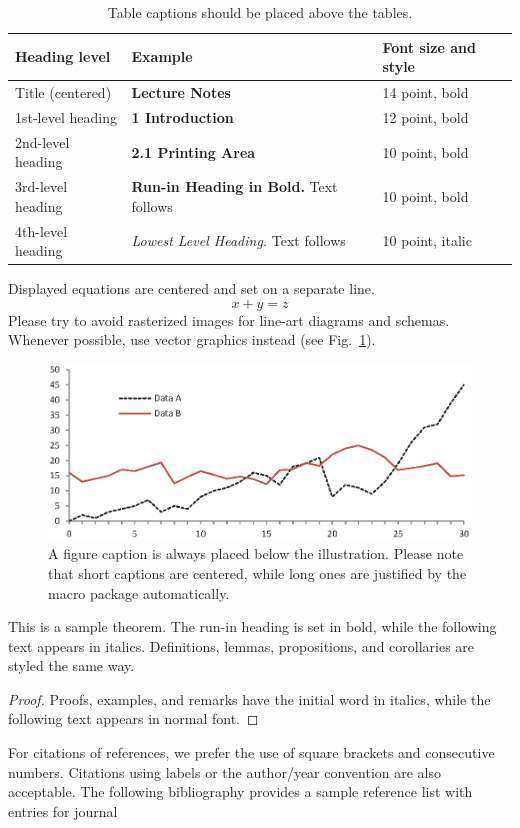 \documentclass{llncs}
\begin{document}
\begin{table}
\caption{Table captions should be placed above the
tables.}\label{tab1}
\begin{tabular}{|l|l|l|}
\hline
Heading level &  Example & Font size and style\\
\hline
Title (centered) &  {\Large\bfseries Lecture Notes} & 14 point, bold\\
1st-level heading &  {\large\bfseries 1 Introduction} & 12 point, bold\\
2nd-level heading & {\bfseries 2.1 Printing Area} & 10 point, bold\\
3rd-level heading & {\bfseries Run-in Heading in Bold.} Text follows & 10 point, bold\\
4th-level heading & {\itshape Lowest Level Heading.} Text follows & 10 point, italic\\
\hline
\end{tabular}
\end{table}


\noindent Displayed equations are centered and set on a separate
line.
\begin{equation}
x + y = z
\end{equation}
Please try to avoid rasterized images for line-art diagrams and
schemas. Whenever possible, use vector graphics instead (see
Fig.~\ref{fig1}).

\begin{figure}
\includegraphics[width=\textwidth]{fig1.eps}
\caption{A figure caption is always placed below the illustration.
Please note that short captions are centered, while long ones are
justified by the macro package automatically.} \label{fig1}
\end{figure}

\begin{theorem}
This is a sample theorem. The run-in heading is set in bold, while
the following text appears in italics. Definitions, lemmas,
propositions, and corollaries are styled the same way.
\end{theorem}
%
%
\begin{proof}
Proofs, examples, and remarks have the initial word in italics,
while the following text appears in normal font.
\end{proof}
For citations of references, we prefer the use of square brackets
and consecutive numbers. Citations using labels or the author/year
convention are also acceptable. The following bibliography provides
a sample reference list with entries for journal




\end{document}
